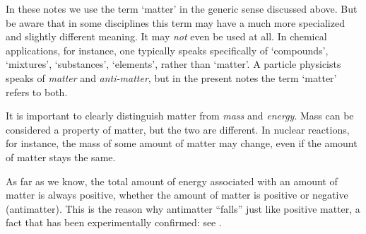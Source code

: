 \documentclass[a4paper,12pt,%
onecolumn,oneside,%
british%
]{memoir}
\providecommand{\href}[2]{#2}
\renewcommand*{\|}[1][]{\nonscript\:#1\vert\nonscript\:\mathopen{}}
\newcommand*{\furl}[2]{\href{#1}{#2}\pagenote{\url{#1}}}
\begin{document}
\begin{warning}
In these notes we use the term \enquote*{matter} in the generic sense discussed above. But be aware that in some disciplines this term may have a much more specialized and slightly different meaning. It may \emph{not} even be used at all. In chemical applications, for instance, one typically speaks specifically of \enquote*{compounds}, \enquote*{mixtures}, \enquote*{substances}, \enquote*{elements}, rather than \enquote*{matter}. A particle physicists speaks of \emph{matter} and \emph{anti-matter}, but in the present notes the term \enquote*{matter} refers to both.
\end{warning}




\begin{warning}
  It is important to clearly distinguish matter from \emph{mass} and \emph{energy}. Mass can be considered a property of matter, but the two are different. In nuclear reactions, for instance, the mass of some amount of matter may change, even if the amount of matter stays the same.

  \smallskip

  As far as we know, the total amount of energy associated with an amount of matter is always positive, whether the amount of matter is positive or negative (antimatter). This is the reason why antimatter \enquote{falls} just like positive matter, a fact that has been experimentally confirmed: see \cites{andersonetal2023}.
\end{warning}
\end{document}
